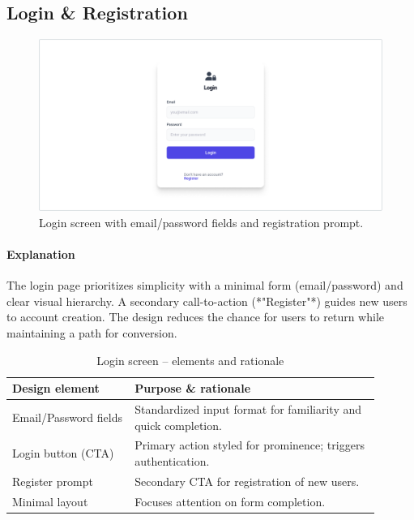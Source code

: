 \documentclass[11pt,a4paper]{article}
\begin{document}
	\subsection{Login \& Registration}\label{subsec:login-register}

	\begin{figure}[H]
		\centering
		\includegraphics[width=1.0\linewidth]{pictures/main/RegisterAccount_Figma}%
		\caption{Login screen with email/password fields and registration prompt.}
		\label{fig:ui-login}
	\end{figure}

	\paragraph{Explanation}%
	The login page prioritizes simplicity with a minimal form (email/password) and clear visual hierarchy.
	A secondary call-to-action (*"Register"*) guides new users to account creation. The design reduces the chance for users to return while maintaining a path for conversion.

	\begin{table}[H]
		\centering
		\caption{Login screen – elements and rationale}
		\label{tab:login-elements}
		\begin{tabular}{p{0.30\linewidth} p{0.60\linewidth}}
			\toprule
			\textbf{Design element} & \textbf{Purpose \& rationale} \\ \midrule
			Email/Password fields   & Standardized input format for familiarity and quick completion. \\
			Login button (CTA)      & Primary action styled for prominence; triggers authentication. \\
			Register prompt        & Secondary CTA for registration of new users. \\
			Minimal layout         & Focuses attention on form completion. \\
			\bottomrule
		\end{tabular}
	\end{table}
	
\end{document}
